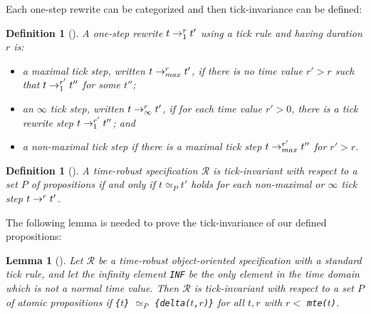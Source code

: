 \documentclass[12pt,onecolumn]{IEEEtranTIE}
\newtheorem{lemma}[theorem]{Lemma}
\newtheorem{definition}[theorem]{Definition}
\begin{document}
Each one-step rewrite can be categorized and then tick-invariance can
be defined:
\begin{definition}[\cite{DBLP:journals/entcs/OlveczkyM07a}]
A one-step rewrite $t\rightarrow^{r}_{1}t'$ using a tick rule and having
duration $r$ is:
\begin{itemize}
\item[--] a \emph{maximal tick step}, written $t\rightarrow^{r}_{max}t'$, if
  there is no time value $r'>r$ such that $t\rightarrow^{r'}_{1}t''$ for some
  $t''$;
\item[--] an \emph{$\infty$ tick step}, written $t\rightarrow^{r}_{\infty}t'$,
  if for each time value $r'>0$, there is a tick rewrite step
  $t\rightarrow^{r'}_{1}t''$; and
\item[--] a \emph{non-maximal tick step} if there is a maximal tick
  step $t\rightarrow^{r'}_{max}t''$ for $r'>r$.
\end{itemize}
\end{definition}
\begin{definition}[\cite{DBLP:journals/entcs/OlveczkyM07a}]
  A time-robust specification $\mathcal{R}$ is \emph{tick-invariant} with
  respect to a set $P$ of propositions if and only if $t\simeq_P t'$
  holds for each non-maximal or $\infty$ tick step $t\rightarrow^{r}_{}t'$.
\end{definition}

The following lemma is needed to prove the tick-invariance of our
defined propositions:
\begin{lemma}[\cite{DBLP:journals/entcs/OlveczkyM07a}]
\label{l:tickinv}
Let $\mathcal{R}$ be a time-robust object-oriented specification with a
standard tick rule, and let the infinity element \verb|INF| be the
only element in the time domain which is not a normal time value.
Then $\mathcal{R}$ is tick-invariant with respect to a set $P$ of atomic
propositions if \verb|{|$t$\verb|}| $\simeq_P$
\verb|{delta(|$t$\verb|,|$r$\verb|)}| for all $t,r$ with $r<$
\verb|mte(|$t$\verb|)|.
\end{lemma}

\newcommand{\mteTask}[2]{\texttt{mteTask(}#1\texttt{,}#2\texttt{)}}
\newcommand{\deltaTask}[3]{\texttt{deltaTask(}#1\texttt{,}#2\texttt{,}#3\texttt{)}}
\newcommand{\mteIS}[1]{\texttt{mteIS(}#1\texttt{)}}
\newcommand{\deltaIS}[2]{\texttt{deltaIS(}#1\texttt{,}#2\texttt{)}}
\newcommand{\IntSrc}[3]{\texttt{<}#1\texttt{:IntSrc|val:}#2\texttt{,cycle:}#3\texttt{>}}
\newcommand{\mteIr}[1]{\texttt{mteIr(}#1\texttt{)}}
\newcommand{\mteS}[1]{\texttt{mte(}#1\texttt{)}}
\newcommand{\deltaS}[2]{\texttt{delta(}#1\texttt{,}#2\texttt{)}}
 
\end{document}
